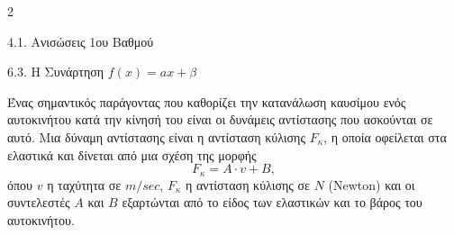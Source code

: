 \begin{ylh}{2}
    \item 4.1. Ανισώσεις 1ου Βαθμού
    \item 6.3. Η Συνάρτηση $f(x)=ax+\beta$
\end{ylh}
Ένας σημαντικός παράγοντας που καθορίζει την κατανάλωση καυσίμου ενός αυτοκινήτου κατά την κίνησή του είναι οι δυνάμεις αντίστασης που ασκούνται σε αυτό. Μια δύναμη αντίστασης είναι η αντίσταση κύλισης $F_\kappa$, η οποία οφείλεται στα ελαστικά και δίνεται από μια σχέση της μορφής
\begin{equation*}
F_\kappa = A \cdot v + B,
\end{equation*}
όπου $v$ η ταχύτητα σε $\si{m/sec}$, $F_\kappa$ η αντίσταση κύλισης σε $\si{N}$ (Newton) και οι συντελεστές $A$ και $B$ εξαρτώνται από το είδος των ελαστικών και το βάρος του αυτοκινήτου.

